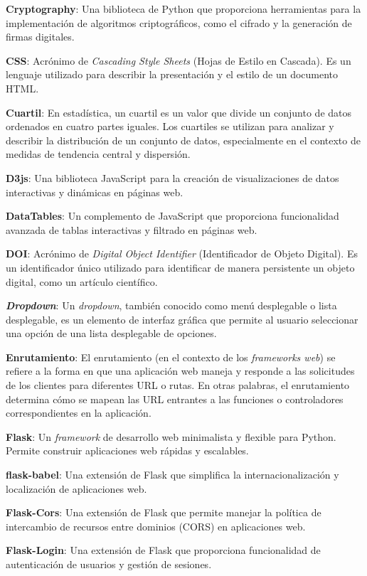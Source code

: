 \textbf{Cryptography}: Una biblioteca de Python que proporciona herramientas para la implementación de algoritmos criptográficos, como el cifrado y la generación de firmas digitales.

\textbf{CSS}: Acrónimo de \textit{Cascading Style Sheets} (Hojas de Estilo en Cascada). Es un lenguaje utilizado para describir la presentación y el estilo de un documento HTML.

\textbf{Cuartil}: En estadística, un cuartil es un valor que divide un conjunto de datos ordenados en cuatro partes iguales. Los cuartiles se utilizan para analizar y describir la distribución de un conjunto de datos, especialmente en el contexto de medidas de tendencia central y dispersión.

\textbf{D3js}: Una biblioteca JavaScript para la creación de visualizaciones de datos interactivas y dinámicas en páginas web.

\textbf{DataTables}: Un complemento de JavaScript que proporciona funcionalidad avanzada de tablas interactivas y filtrado en páginas web.

\textbf{DOI}: Acrónimo de \textit{Digital Object Identifier} (Identificador de Objeto Digital). Es un identificador único utilizado para identificar de manera persistente un objeto digital, como un artículo científico.

\textbf{\textit{Dropdown}}: Un \textit{dropdown}, también conocido como menú desplegable o lista desplegable, es un elemento de interfaz gráfica que permite al usuario seleccionar una opción de una lista desplegable de opciones. 

\textbf{Enrutamiento}: El enrutamiento (en el contexto de los \textit{frameworks web}) se refiere a la forma en que una aplicación web maneja y responde a las solicitudes de los clientes para diferentes URL o rutas. En otras palabras, el enrutamiento determina cómo se mapean las URL entrantes a las funciones o controladores correspondientes en la aplicación.

\textbf{Flask}: Un \textit{framework} de desarrollo web minimalista y flexible para Python. Permite construir aplicaciones web rápidas y escalables.

\textbf{flask-babel}: Una extensión de Flask que simplifica la internacionalización y localización de aplicaciones web.

\textbf{Flask-Cors}: Una extensión de Flask que permite manejar la política de intercambio de recursos entre dominios (CORS) en aplicaciones web.

\textbf{Flask-Login}: Una extensión de Flask que proporciona funcionalidad de autenticación de usuarios y gestión de sesiones.

